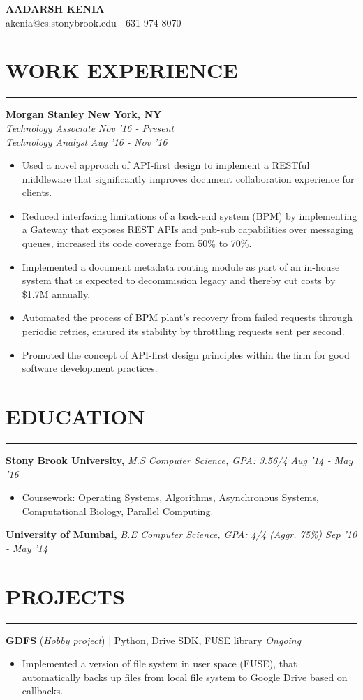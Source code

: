 \documentclass[12pt]{article}
\newcommand{\sectionHeading}[1]{
\section*{\small{#1}}
\vspace{-8pt}
\hrule
\vspace{8pt}
}
\newcommand{\experienceSectionSubheading}[6]{
  \vspace{-1pt}
    \small{\textbf{Morgan Stanley \hfill New York, NY}} \\
    \small{\textit{#3} \hfill \textit{#4}} \\
    \small{\textit{#5} \hfill \textit{#6}} \\
    \vspace{-15pt}
}
\newcommand {\projectSectionSubheading}[4]{
    \noindent \small{\textbf{#1} (\textit{#2}) | #3 \hfill \textit{#4}} \\
    \vspace{-20pt}
}
\newcommand{\educationSectionSubheading}[3]{
    \noindent \small{\textbf{#1, }\textit{#2 \hfill #3}}\\ \vspace{-18pt}
}
\newcommand{\sectionListStart}{
    \begin{itemize}[label={\small{\textbullet}}, leftmargin=20pt] %
}
\newcommand{\sectionListEnd}{\end{itemize}}
\newcommand{\sectionListItem}[1]{\item \small{#1}}
\begin{document}
\begin{center}
\LARGE{\textbf{AADARSH KENIA}}\\
\vspace{4pt}
\small{\Letter \hspace{2mm}akenia@cs.stonybrook.edu} | \Telefon \hspace{2mm}631 974 8070
\end{center}

\sectionHeading{WORK EXPERIENCE}
\experienceSectionSubheading
{Morgan Stanley}{New York, NY}
{Technology Associate}{Nov '16 - Present}
{Technology Analyst}{Aug '16 - Nov '16}
\sectionListStart
    \sectionListItem
        Used a novel approach of API-first design to implement a RESTful middleware that significantly improves document collaboration experience for clients.

    \sectionListItem
        Reduced interfacing limitations of a back-end system (BPM) by implementing a Gateway that exposes REST APIs and pub-sub capabilities over messaging queues, increased its code coverage from 50\% to 70\%.

    \sectionListItem
        Implemented a document metadata routing module as part of an in-house system that is expected to decommission legacy and thereby cut costs by \$1.7M annually.
        
    \sectionListItem
        Automated the process of BPM plant's recovery from failed requests through periodic retries, ensured its stability by throttling requests sent per second. 
        
    \sectionListItem
        Promoted the concept of API-first design principles within the firm for good software development practices.
        
\sectionListEnd


\sectionHeading{EDUCATION}
\educationSectionSubheading
{Stony Brook  University}{M.S Computer Science, GPA: 3.56/4}{Aug '14 - May '16}
\sectionListStart
    \sectionListItem
        Coursework: Operating Systems, Algorithms, Asynchronous Systems, Computational Biology, Parallel Computing. 
\sectionListEnd

\educationSectionSubheading
{University of Mumbai}{B.E Computer Science, GPA: 4/4 (Aggr. 75\%)}{Sep '10 - May '14}


\sectionHeading{PROJECTS}
\projectSectionSubheading{GDFS}{Hobby project}{Python, Drive SDK, FUSE library}{Ongoing}
\sectionListStart
    \sectionListItem
        Implemented a version of file system in user space (FUSE), that automatically backs up files from local file system to Google Drive based on callbacks. 
\sectionListEnd
\end{document}
